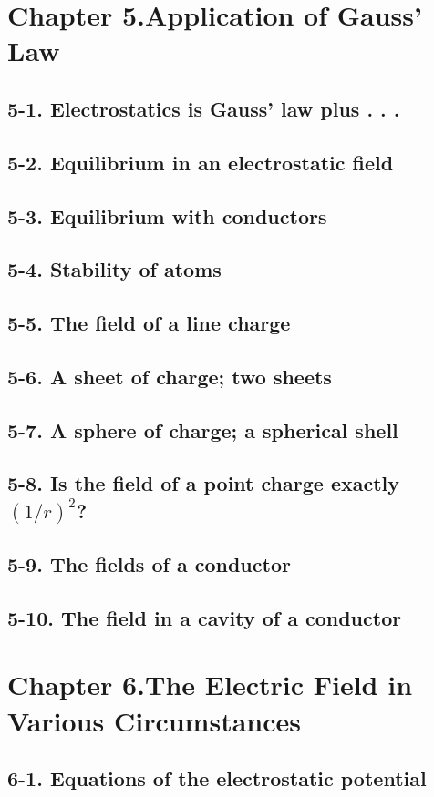 \documentclass{article}
\begin{document}
\section{Chapter 5.Application of Gauss’ Law}
\subsection{5-1. Electrostatics is Gauss’ law plus . . .}
\subsection{5-2. Equilibrium in an electrostatic field}
\subsection{5-3. Equilibrium with conductors}
\subsection{5-4. Stability of atoms}
\subsection{5-5. The field of a line charge}
\subsection{5-6. A sheet of charge; two sheets}
\subsection{5-7. A sphere of charge; a spherical shell}
\subsection{5-8. Is the field of a point charge exactly $(1/r)^2$?}
\subsection{5-9. The fields of a conductor}
\subsection{5-10. The field in a cavity of a conductor}
\section{Chapter 6.The Electric Field in Various Circumstances}
\subsection{6-1. Equations of the electrostatic potential}
\end{document}
